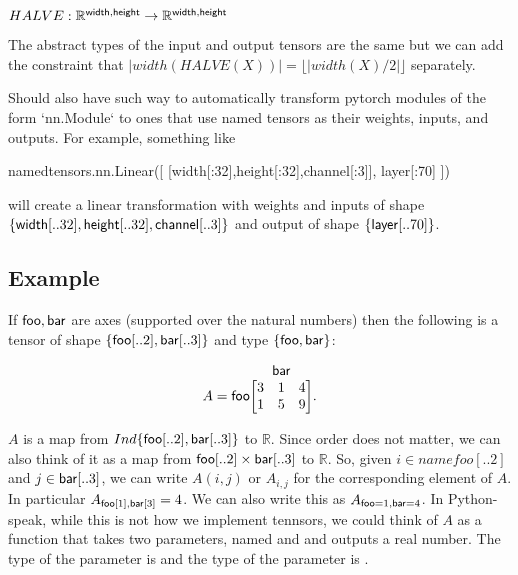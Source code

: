 \documentclass{article}
\makeatletter
\newcommand{\nmatrix}[3]{\name{#1}\begin{array}[b]{@{}c@{}}\name{#2}\\\begin{bmatrix}#3\end{bmatrix}\end{array}}
\makeatother
\begin{document}
$HALVE:\mathbb{R}^{\mathsf{width},\mathsf{height}} \rightarrow \mathbb{R}^{\mathsf{width},\mathsf{height}}$

The abstract types of the input and output tensors are the same but we can add the constraint that $|width(HALVE(X))|=\lfloor |width(X)/2| \rfloor$ separately.


Should also have such way to automatically transform pytorch modules of the form `nn.Module` to ones that use named tensors as their weights, inputs, and outputs.
For example, something like 

\begin{python}
namedtensors.nn.Linear([ [width[:32],height[:32],channel[:3]], layer[:70] ])
\end{python}

will create a linear transformation with weights and inputs of shape $\{ \mathsf{width}[..32], \mathsf{height}[..32],\mathsf{channel}[..3] \}$ and output of shape $\{ \mathsf{layer}[..70] \}$. 





\subsection{Example}


If $\mathsf{foo}, \mathsf{bar}$ are axes (supported over the natural numbers) then the following is a tensor of shape $\{ \mathsf{foo}[..2], \mathsf{bar}[..3] \}$ and type $\{ \mathsf{foo} , \mathsf{bar} \}$: 

\begin{equation*}
A = \nmatrix{foo}{bar}{
  3 & 1 & 4 \\
  1 & 5 & 9
}.
\end{equation*}


$A$ is a map from $Ind \{ \mathsf{foo}[..2] , \mathsf{bar}[..3] \}$ to $\mathbb{R}$. Since order does not matter, we can also think of it as a map from $\mathsf{foo}[..2] \times \mathsf{bar}[..3]$ to $\mathbb{R}$.
So, given $i \in name{foo}[..2]$ and $j \in \mathsf{bar}[..3]$, we can write $A(i,j)$ or $A_{i,j}$ for the corresponding element of $A$.
In particular $A_{\mathsf{foo}[1],\mathsf{bar}[3]}=4$. We can also write this as $A_{\mathsf{foo}=1,\mathsf{bar}=4}$. In Python-speak, while this is not how we implement tennsors, we could think of $A$ as a function that takes two parameters, named  and  and outputs a real number. The type of the parameter  is  and the type of the parameter  is .
\end{document}
